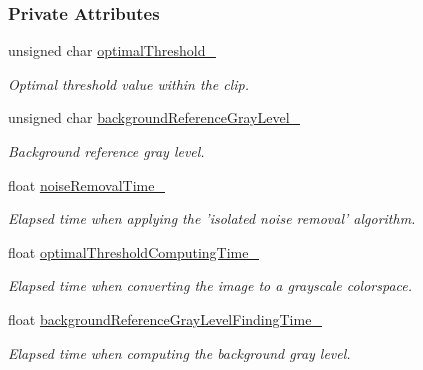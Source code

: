 \subsubsection*{Private Attributes}
\begin{CompactItemize}
\item 
\hypertarget{class_preprocessor_865b1e28dd9535b96f70727a550104fe}{
unsigned char \hyperlink{class_preprocessor_865b1e28dd9535b96f70727a550104fe}{optimalThreshold\_\-}}
\label{class_preprocessor_865b1e28dd9535b96f70727a550104fe}

\begin{CompactList}\small\item\em Optimal threshold value within the clip. \item\end{CompactList}\item 
\hypertarget{class_preprocessor_2c9e44ff6522b2ce35d6bc6161ad2680}{
unsigned char \hyperlink{class_preprocessor_2c9e44ff6522b2ce35d6bc6161ad2680}{backgroundReferenceGrayLevel\_\-}}
\label{class_preprocessor_2c9e44ff6522b2ce35d6bc6161ad2680}

\begin{CompactList}\small\item\em Background reference gray level. \item\end{CompactList}\item 
\hypertarget{class_preprocessor_d6e3bee674df10921f29612bc5bc6978}{
float \hyperlink{class_preprocessor_d6e3bee674df10921f29612bc5bc6978}{noiseRemovalTime\_\-}}
\label{class_preprocessor_d6e3bee674df10921f29612bc5bc6978}

\begin{CompactList}\small\item\em Elapsed time when applying the 'isolated noise removal' algorithm. \item\end{CompactList}\item 
\hypertarget{class_preprocessor_d52352691de7d8f0738b67e93a5898fc}{
float \hyperlink{class_preprocessor_d52352691de7d8f0738b67e93a5898fc}{optimalThresholdComputingTime\_\-}}
\label{class_preprocessor_d52352691de7d8f0738b67e93a5898fc}

\begin{CompactList}\small\item\em Elapsed time when converting the image to a grayscale colorspace. \item\end{CompactList}\item 
\hypertarget{class_preprocessor_98ea95388e043eef5460beaf2e3aaaed}{
float \hyperlink{class_preprocessor_98ea95388e043eef5460beaf2e3aaaed}{backgroundReferenceGrayLevelFindingTime\_\-}}
\label{class_preprocessor_98ea95388e043eef5460beaf2e3aaaed}

\begin{CompactList}\small\item\em Elapsed time when computing the background gray level. \item\end{CompactList}\end{CompactItemize}


